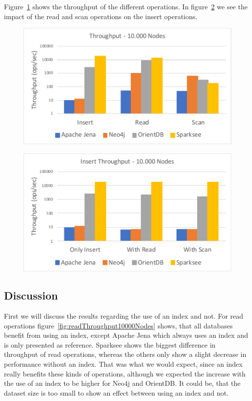 Figure~\ref{fig:operationReadScan} shows the throughput of the different operations.
In figure~\ref{fig:insertWithWithoutReadScan} we see the impact of the read and scan operations on the insert operations.

\begin{figure}[h!]
  \centering
  \includegraphics[width=.75\textwidth]{images/responsiveness/operationReadScan}
  \label{fig:operationReadScan}
\end{figure}

\begin{figure}[h!]
  \centering
  \includegraphics[width=.75\textwidth]{images/responsiveness/insertWithWithoutReadScan}
  \label{fig:insertWithWithoutReadScan}
\end{figure}

\subsection{Discussion}
First we will discuss the results regarding the use of an index and not.
For read operations figure~\ref{fig:readThroughput10000Nodes} shows,
that all databases benefit from using an index,
except Apache Jena which always uses an index and is only presented as reference.
Sparksee shows the biggest difference in throughput of read operations,
whereas the others only show a slight decrease in performance without an index.
That was what we would expect,
since an index really benefits these kinds of operations,
although we expected the increase with the use of an index to be higher for Neo4j and OrientDB.
It could be,
that the dataset size is too small to show an effect between using an index and not.

